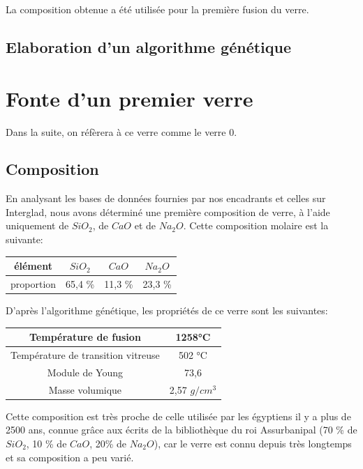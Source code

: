 \documentclass{article}
\begin{document}
La composition obtenue a été utilisée pour la première fusion du verre.

\subsection{Elaboration d'un algorithme génétique}

\section{Fonte d'un premier verre}
Dans la suite, on réfèrera à ce verre comme le verre 0.
\subsection{Composition}

En analysant les bases de données fournies par nos encadrants et celles sur Interglad, nous avons déterminé une première composition de verre, à l'aide uniquement de $SiO_2$, de $CaO$ et de $Na_2O$. Cette composition molaire est la suivante:

\begin{table}[h!]
\centering
\begin{tabular}{|c|c|c|c|}
    \hline
    élément &  $SiO_2$ & $CaO$ & $Na_2O$ \\
    \hline
    proportion & 65,4 \% & 11,3 \% & 23,3 \% \\
    \hline
    \end{tabular} 
\end{table}

D'après l'algorithme génétique, les propriétés de ce verre sont les suivantes:

\begin{table}[h!]
\centering
\begin{tabular}{|c|c|}
    \hline
    Température de fusion & 1258°C \\
    \hline
    Température de transition vitreuse & 502 °C \\
    \hline
    Module de Young & 73,6 \\
    \hline
    Masse volumique & 2,57 $g/cm^{3}$ \\
    \hline
    \end{tabular}
\end{table}

Cette composition est très proche de celle utilisée par les égyptiens il y a plus de 2500 ans, connue grâce aux écrits de la bibliothèque du roi Assurbanipal (70 \% de $SiO_2$, 10 \% de $CaO$, 20\% de $Na_2O$), car le verre est connu depuis très longtemps et sa composition a peu varié. 
\end{document}
